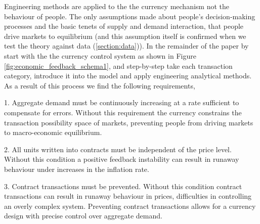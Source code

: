 %



Engineering methods are applied to the the currency mechanism not the behaviour of people. The only
assumptions made about people's decision-making processes and the basic tenets of supply and demand
interaction, that people drive markets to equilibrium (and this assumption itself is confirmed when
we test the theory against data (\ref{section:data})). In the remainder of the paper by start with
the the currency control system as shown in Figure \ref{fig:economic_feedback_schema1}, and
step-by-step take each transaction category, introduce it into the model and apply engineering
analytical methods. As a result of this process we find the following requirements, 

1. Aggregate demand must be continuously increasing at a rate sufficient to compensate for errors.
Without this requirement the currency constrains the transaction possibility space of markets,
preventing people from driving markets to macro-economic equilibrium.

2. All units written into contracts must be independent of the price level. Without this condition a
positive feedback instability can result in runaway behaviour under increases in the inflation rate.

3. Contract transactions must be prevented. Without this condition contract transactions can result
in runaway behaviour in prices, difficulties in controlling an overly complex system. Preventing
contract transactions allows for a currency design with precise control over aggregate demand.

